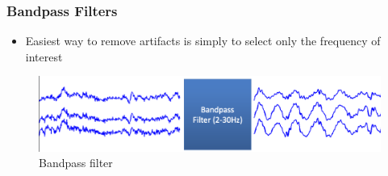 \documentclass{beamer}
\begin{document}
\begin{frame}
\frametitle{Bandpass Filters}
\begin{itemize}
	\item Easiest way to remove artifacts is simply to select only the frequency of interest	
\end{itemize}
\begin{figure}
	\includegraphics[width=0.8\linewidth]{image/spectral}
	\caption{Bandpass filter}
\end{figure}
\end{frame}
%
%
%
\end{document}
